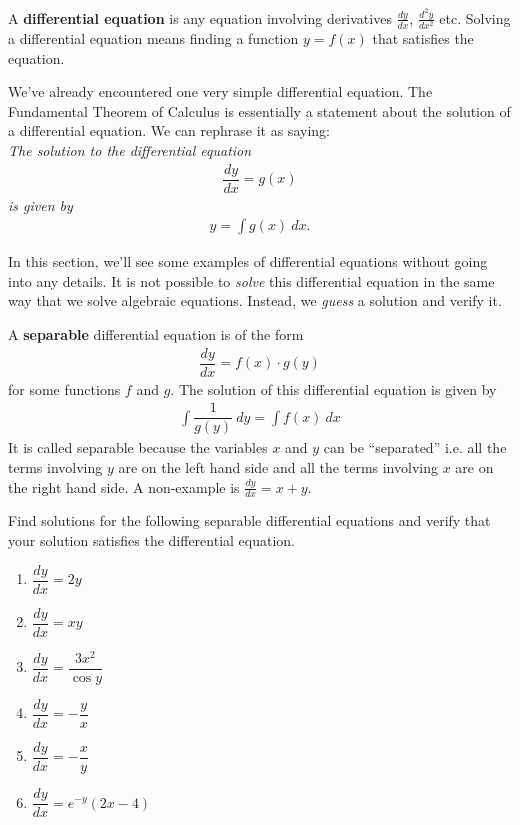 A {\bf differential equation} is any equation involving derivatives $\frac{dy}{dx}$, $\frac{d^2y}{dx^2}$ etc.
Solving a differential equation means finding a function $y = f(x)$ that satisfies the equation.

We've already encountered one very simple differential equation.
The Fundamental Theorem of Calculus is essentially a statement about the solution of a differential equation.
We can rephrase it as saying:\\ {\it The solution to the differential equation
\begin{align*}
  \dfrac{dy}{dx} = g(x)
\end{align*}
is given by
\begin{align*}
  y = \int g(x) \: dx.
\end{align*}
}

In this section, we'll see some examples of differential equations without going into any details.
It is not possible to {\it solve} this differential equation in the same way that we solve algebraic equations. Instead, we {\it guess} a solution and verify it.

\begin{exercise}
  A {\bf separable} differential equation is of the form
  \begin{align*}
    \dfrac{dy}{dx} = f(x) \cdot g(y)
  \end{align*}
  for some functions $f$ and $g$. The solution of this differential equation is given by
  \begin{align*}
    \int \dfrac{1}{g(y)} \: dy  = \int f(x) \: dx
  \end{align*}
  It is called separable because the variables $x$ and $y$ can be ``separated'' i.e. all the terms involving $y$ are on the left hand side and all the terms involving $x$ are on the right hand side. A non-example is $\frac{dy}{dx} = x + y$.

  Find solutions for the following separable differential equations and verify that your solution satisfies the differential equation.
  \begin{multicols}{2}
    \begin{enumerate}
      \item $\dfrac{dy}{dx} = 2y$
      \item $\dfrac{dy}{dx} = xy$
      \item $\dfrac{dy}{dx} = \dfrac{3x^2}{\cos y}$
      \item $\dfrac{dy}{dx} = - \dfrac{y}{x}$
      \item $\dfrac{dy}{dx} = - \dfrac{x}{y}$
      \item $\dfrac{dy}{dx} = e^{-y}(2x - 4) $
    \end{enumerate}
  \end{multicols}
\end{exercise}

